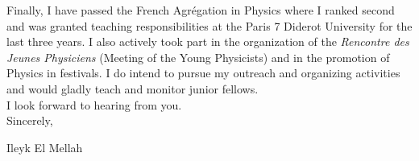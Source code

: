 \documentclass[12pt]{letter}
\begin{document}
\begin{letter} {}
\hspace*{0.5cm} Finally, I have passed the French Agr\'egation in Physics where I ranked second and was granted teaching responsibilities at the Paris 7 Diderot University for the last three years. I also actively took part in the organization of the \textit{Rencontre des Jeunes Physiciens} (Meeting of the Young Physicists) and in the promotion of Physics in festivals. I do intend to pursue my outreach and organizing activities and would gladly teach and monitor junior fellows.\\
\hspace*{0.5cm} I look forward to hearing from you.\\
 
Sincerely,
 
\closing{Ileyk E{\sc l Mellah}} 


  \end{letter}
  
  
 
\end{document}
